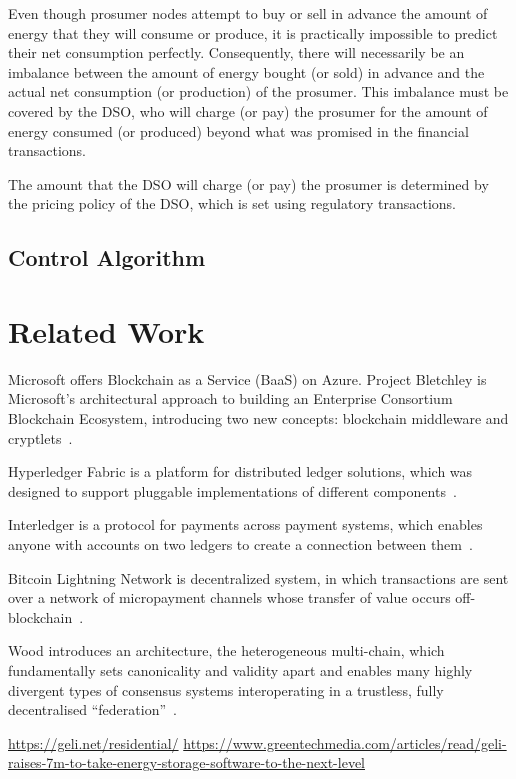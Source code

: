 \documentclass[sigconf]{acmart}
\begin{document}
Even though prosumer nodes attempt to buy or sell in advance the amount of energy that they will consume or produce, it is practically impossible to predict their net consumption perfectly.
Consequently, there will necessarily be an imbalance between the amount of energy bought (or sold) in advance and the actual net consumption (or production) of the prosumer.
This imbalance must be covered by the DSO, who will charge (or pay) the prosumer for the amount of energy consumed (or produced) beyond what was promised in the financial transactions.

The amount that the DSO will charge (or pay) the prosumer is determined by the pricing policy of the DSO, which is set using regulatory transactions.


\subsection{Control Algorithm}




\section{Related Work}

Microsoft offers Blockchain as a Service (BaaS) on Azure.
Project Bletchley is Microsoft's architectural approach to building an Enterprise Consortium Blockchain Ecosystem, introducing two new concepts: blockchain middleware and cryptlets~\cite{gray2016introducing}.

Hyperledger Fabric is a platform for distributed ledger solutions, which was designed to support pluggable implementations of different components~\cite{hyperledger2017fabric}.

Interledger is a protocol for payments across payment systems, which enables anyone with accounts on two ledgers to create
a connection between them~\cite{thomas_protocol}.

Bitcoin Lightning Network is decentralized system, in which transactions are sent over a network of micropayment channels whose transfer of value occurs off-blockchain~\cite{poon2016bitcoin}.

Wood introduces an architecture, the heterogeneous multi-chain, which fundamentally sets canonicality and validity apart and enables many highly divergent types of consensus systems interoperating in a trustless, fully decentralised ``federation''~\cite{wood_polkadot}.

\url{https://geli.net/residential/}
\url{https://www.greentechmedia.com/articles/read/geli-raises-7m-to-take-energy-storage-software-to-the-next-level}




\end{document}

